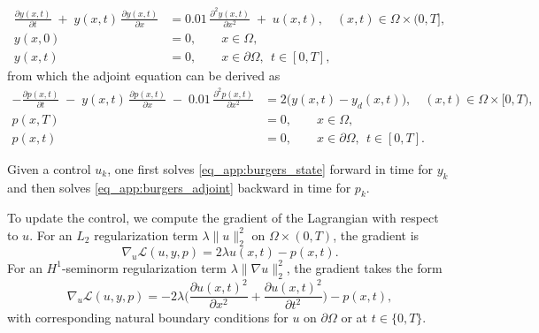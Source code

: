 \documentclass[final,1p,times]{elsarticle}
\theoremstyle{plain} %
\theoremstyle{definition} %
\theoremstyle{remark} %
\begin{document}
\begin{equation}\label{eq_app:burgers_state}
\begin{aligned}
\frac{\partial y(x,t)}{\partial t}
\;+\; y(x,t)\,\frac{\partial y(x,t)}{\partial x}
&= 0.01\,\frac{\partial^2 y(x,t)}{\partial x^2} \;+\; u(x,t),
\quad (x,t)\in\Omega\times(0,T],\\
y(x,0) &= 0, \qquad x\in\Omega,\\
y(x,t) &= 0, \qquad x\in\partial\Omega,\ \ t\in[0,T],
\end{aligned}
\end{equation}
from which the adjoint equation can be derived as
\begin{equation}\label{eq_app:burgers_adjoint}
\begin{aligned}
-\frac{\partial p(x,t)}{\partial t}
\;-\; y(x,t)\,\frac{\partial p(x,t)}{\partial x}
\;-\; 0.01\,\frac{\partial^2 p(x,t)}{\partial x^2}
&= 2\bigl(y(x,t)-y_d(x,t)\bigr),
\quad (x,t)\in\Omega\times[0,T),\\
p(x,T) &= 0, \qquad x\in\Omega,\\
p(x,t) &= 0, \qquad x\in\partial\Omega,\ \ t\in[0,T].
\end{aligned}
\end{equation}

Given a control $u_k$, one first solves \eqref{eq_app:burgers_state} forward in time for $y_k$ and then solves \eqref{eq_app:burgers_adjoint} backward in time for $p_k$.

To update the control, we compute the gradient of the Lagrangian with respect to $u$.
For an $L_2$ regularization term $\lambda\|u\|_{2}^2$ on $\Omega\times(0,T)$, the gradient is
\begin{equation}\label{eq_app:burgers_adjoint_L2_grad}
\nabla_u \mathcal{L}(u,y,p)=2\lambda u(x,t) - p(x,t).
\end{equation}
For an $H^1$-seminorm regularization term $\lambda\|\nabla u\|_{2}^2$, the gradient takes the form
\begin{equation}\label{eq_app:burgers_adjoint_H1_grad}
\nabla_u \mathcal{L}(u,y,p)= -2\lambda\bigl(\frac{\partial u(x,t)^2}{\partial x^2}+\frac{\partial u(x,t)^2}{\partial t^2}\bigr) - p(x,t),
\end{equation}
with corresponding natural boundary conditions for $u$ on $\partial\Omega$ or at $t\in\{0,T\}$.
\end{document}
